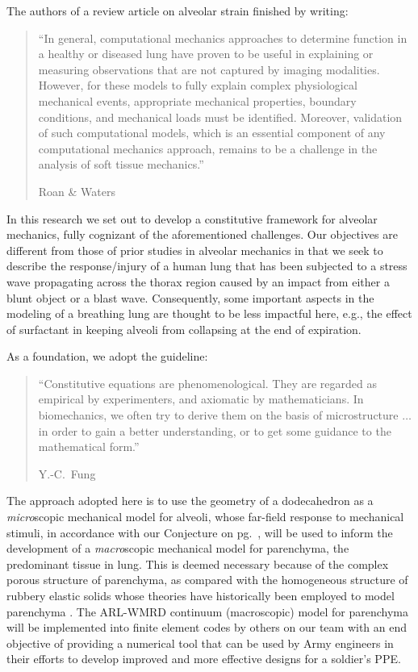 The authors of a review article on alveolar strain finished by writing:
\begin{quotation}
    \noindent\small ``In general, computational mechanics approaches to determine function in a healthy or diseased lung have proven to be useful in explaining or measuring observations that are not captured by imaging modalities. However, for these models to fully explain complex physiological mechanical events, appropriate mechanical properties, boundary conditions, and mechanical loads must be identified. Moreover, validation of such computational models, which is an essential component of any computational mechanics approach, remains to be a challenge in the analysis of soft tissue mechanics.''
    
    \nopagebreak
    \mbox{} \hfill Roan \& Waters \cite[pg.~L633]{RoanWaters11} \normalsize
\end{quotation}
In this research we set out to develop a constitutive framework for alveolar mechanics, fully cognizant of the aforementioned challenges.  Our objectives are different from those of prior studies in alveolar mechanics in that we seek to describe the response\slash injury of a human lung that has been subjected to a stress wave propagating across the thorax region caused by an impact from either a blunt object or a blast wave.  Consequently, some important aspects in the modeling of a breathing lung are thought to be less impactful here, e.g., the effect of surfactant in keeping alveoli from collapsing at the end of expiration.

As a foundation, we adopt the guideline:
\begin{quotation}
	\noindent\small ``Constitutive equations are phenomenological. They are regarded as empirical by experimenters, and axiomatic by mathematicians.  In biomechanics, we often try to derive them on the basis of micro\-structure $\ldots$ in order to gain a better understanding, or to get some guidance to the mathematical form.''
	
	\nopagebreak
	\mbox{} \hfill Y.-C.~Fung \cite[pg.~431]{Fung90} \normalsize
\end{quotation}
The approach adopted here is to use the geometry of a dodecahedron as a \textit{micro}\-scopic mechanical model for alveoli, whose far-field response to mechanical stimuli, in accordance with our Conjecture on pg.~\pageref{conjecture}, will be used to inform the development of a \textit{macro\/}scopic mechanical model for parenchyma, \cite{ClaytonFreed19,ClaytonFreed20} the predominant tissue in lung.  This is deemed necessary because of the complex porous structure of parenchyma, as compared with the homo\-geneous structure of rubbery elastic solids whose theories have historically been employed to model parenchyma \cite{Fung75,Fungetal78,Vawteretal79,Fung88}.  The ARL-WMRD continuum (macroscopic) model for parenchyma \cite{ClaytonFreed19} will be implemented into finite element codes by others on our team with an end objective of providing a numerical tool that can be used by Army engineers in their efforts to develop improved and more effective designs for a soldier's PPE. 

